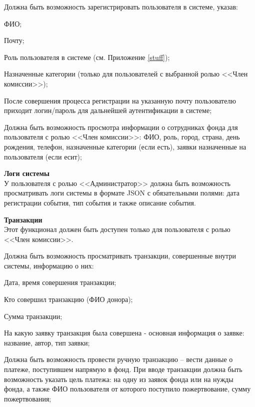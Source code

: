 \begin{subreg}
\begin{subreg}
        \item \label{enum:reg} Должна быть возможность зарегистрировать пользователя в системе, указав:
        \begin{subreg}
            \item ФИО;
            \item Почту;
            \item Роль пользователя в системе (см. Приложение \ref{stuff});
            \item Назначенные категории (только для пользователей с выбранной ролью <<Член комиссии>>);
        \end{subreg}
        После совершения процесса регистрации на указанную почту пользователю приходит логин/пароль для дальнейшей аутентификации в системе;
        \item \label{enum:managers} Должна быть возможность просмотра информации о сотрудниках фонда для пользователя с ролью <<Член комиссии>>: ФИО, роль, город, страна, день рождения, телефон, назначенные категории (если есть), заявки назначенные на пользователя (если есит);
        \end{subreg}
        
    \item \textbf{Логи системы\\}
    У пользователя с ролью <<Администратор>> должна быть возможность просматривать логи системы в формате JSON с обязательными полями: дата регистрации события, тип события и также описание события.
    
    \item \textbf{Транзакции\\}
    Этот функционал должен быть доступен только для пользователя с ролью <<Член комиссии>>.
    \begin{subreg}
        \item Должна быть возможность просматривать транзакции, совершенные внутри системы, информацию о них:
    \begin{subreg}
        \item Дата, время совершения транзакции;
        \item Кто совершил транзакцию (ФИО донора);
        \item Сумма транзакции;
        \item На какую заявку транзакция была совершена - основная информация о заявке: название, автор, тип заявки;
    \end{subreg}
        \item Должна быть возможность провести ручную транзакцию -- вести данные о платеже, поступившем напрямую в фонд. При вводе транзакции должна быть возможность указать цель платежа: на одну из заявок фонда или на нужды фонда, а также ФИО пользователя от которого поступило пожертвование, сумму пожертвования;
    \end{subreg}
    

\end{subreg}
